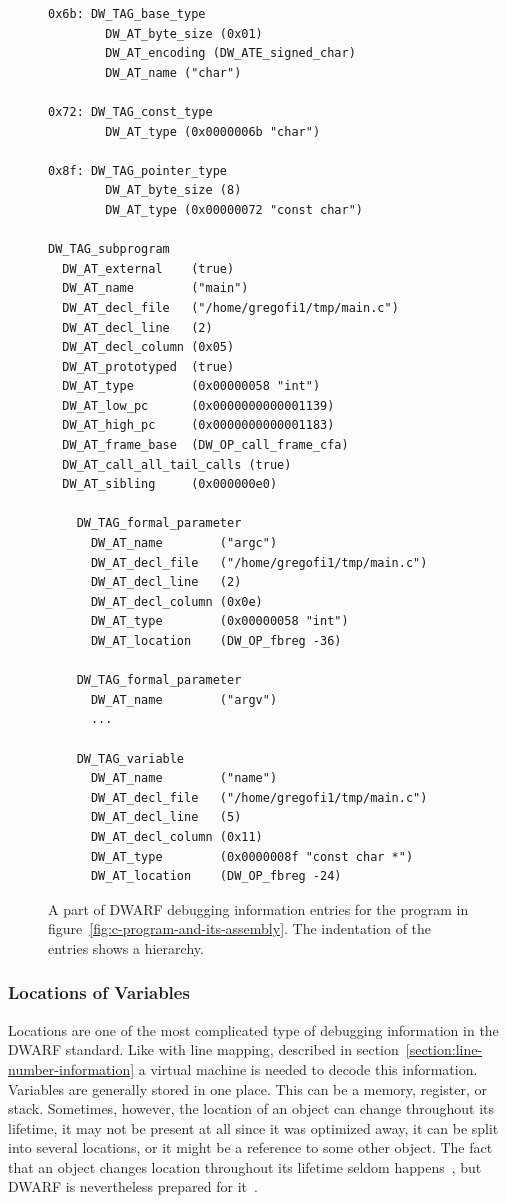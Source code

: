 \begin{figure}
    \begin{lstlisting}
0x6b: DW_TAG_base_type
        DW_AT_byte_size (0x01)
        DW_AT_encoding (DW_ATE_signed_char)
        DW_AT_name ("char")

0x72: DW_TAG_const_type
        DW_AT_type (0x0000006b "char")

0x8f: DW_TAG_pointer_type
        DW_AT_byte_size	(8)
        DW_AT_type (0x00000072 "const char")

DW_TAG_subprogram
  DW_AT_external	(true)
  DW_AT_name	    ("main")
  DW_AT_decl_file	("/home/gregofi1/tmp/main.c")
  DW_AT_decl_line	(2)
  DW_AT_decl_column	(0x05)
  DW_AT_prototyped	(true)
  DW_AT_type        (0x00000058 "int")
  DW_AT_low_pc      (0x0000000000001139)
  DW_AT_high_pc	    (0x0000000000001183)
  DW_AT_frame_base	(DW_OP_call_frame_cfa)
  DW_AT_call_all_tail_calls	(true)
  DW_AT_sibling	    (0x000000e0)

    DW_TAG_formal_parameter
      DW_AT_name	    ("argc")
      DW_AT_decl_file	("/home/gregofi1/tmp/main.c")
      DW_AT_decl_line	(2)
      DW_AT_decl_column	(0x0e)
      DW_AT_type	    (0x00000058 "int")
      DW_AT_location	(DW_OP_fbreg -36)

    DW_TAG_formal_parameter
      DW_AT_name	    ("argv")
      ...

    DW_TAG_variable
      DW_AT_name	    ("name")
      DW_AT_decl_file	("/home/gregofi1/tmp/main.c")
      DW_AT_decl_line	(5)
      DW_AT_decl_column	(0x11)
      DW_AT_type	    (0x0000008f "const char *")
      DW_AT_location	(DW_OP_fbreg -24)
    \end{lstlisting}
    \caption{A part of DWARF debugging information entries for the program in
    figure~\ref{fig:c-program-and-its-assembly}. The indentation of the entries
    shows a hierarchy.}
    \label{fig:dwarf-die}
\end{figure}

\subsubsection{Locations of Variables}\label{section:dwarf-location}
Locations are one of the most complicated type of debugging information in the
DWARF standard. Like with line mapping, described in
section~\ref{section:line-number-information} a virtual machine is needed to
decode this information. Variables are generally stored in one place. This can
be a memory, register, or stack. Sometimes, however, the location of an object
can change throughout its lifetime, it may not be present at all since it was
optimized away, it can be split into several locations, or it might be a
reference to some other object. The fact that an object changes location
throughout its lifetime seldom happens~\cite{dwarf-intro}, but DWARF is
nevertheless prepared for it~\cite{dwarf}.

